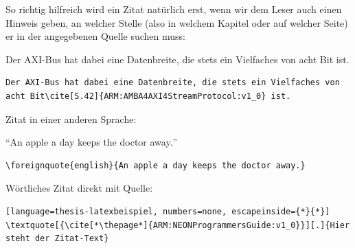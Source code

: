 			So richtig hilfreich wird ein Zitat natürlich erst, wenn wir dem Leser auch einen Hinweis geben, an welcher Stelle (also \zb{} in welchem Kapitel oder auf welcher Seite) er in der angegebenen Quelle suchen muss:
			\begin{vorlagenbeispiel}
				Der AXI-Bus hat dabei eine Datenbreite, die stets ein Vielfaches von acht Bit\cite[S.42]{ARM:AMBA4AXI4StreamProtocol:v1_0} ist.
			\end{vorlagenbeispiel}
			\begin{lstlisting}[language=thesis-latexbeispiel, numbers=none]
Der AXI-Bus hat dabei eine Datenbreite, die stets ein Vielfaches von acht Bit\cite[S.42]{ARM:AMBA4AXI4StreamProtocol:v1_0} ist.
			\end{lstlisting}
			\medskip
			
			\noindent
			Zitat in einer anderen Sprache:
			\begin{vorlagenbeispiel}
				\foreignquote{english}{An apple a day keeps the doctor away.}
			\end{vorlagenbeispiel}
			\begin{lstlisting}[language=thesis-latexbeispiel, numbers=none]
\foreignquote{english}{An apple a day keeps the doctor away.}
			\end{lstlisting}
			\medskip
			
			\noindent
			Wörtliches Zitat direkt mit Quelle: 
			\begin{vorlagenbeispiel}
			\end{vorlagenbeispiel}
			\begin{lstlisting}[language=thesis-latexbeispiel, numbers=none, escapeinside={*}{*}]
\textquote[{\cite[*\thepage*]{ARM:NEONProgrammersGuide:v1_0}}][.]{Hier steht der Zitat-Text}
			\end{lstlisting}
			\medskip
		
